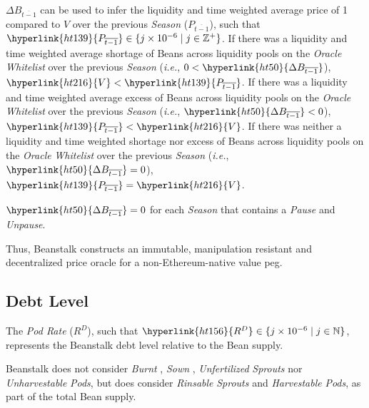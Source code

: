 \documentclass[tikz]{article}
\newcommand{\term}[1]{\textsl{#1}}
\newcommand{\Bean}{} %
\begin{document}
\hyperlink{ht50}{$\Delta B_{\overline{t-1}}$} can be used to infer the liquidity and time weighted average price of \Bean1 compared to \hyperlink{ht216}{$V$} over the previous \term{Season} (\hyperlink{ht139}{$P_{\overline{t-1}}$}), such that $\hyperlink{ht139}{P_{\overline{t-1}}} \in \{j \times 10^{-6} \mid j \in \mathbb{Z}^{+} \}$. If there was a liquidity and time weighted average shortage of Beans across liquidity pools on the \term{Oracle} \term{Whitelist} over the previous \term{Season} (\term{i.e.}, $0 < \hyperlink{ht50}{\Delta B_{\overline{t-1}}}$), $\hyperlink{ht216}{V} < \hyperlink{ht139}{P_{\overline{t-1}}}$. If there was a liquidity and time weighted average excess of Beans across liquidity pools on the \term{Oracle} \term{Whitelist} over the previous \term{Season} (\term{i.e.}, $\hyperlink{ht50}{\Delta B_{\overline{t-1}}} < 0$), $\hyperlink{ht139}{P_{\overline{t-1}}} < \hyperlink{ht216}{V}$. If there was neither a liquidity and time weighted shortage nor excess of Beans across liquidity pools on the \term{Oracle} \term{Whitelist} over the previous \term{Season} (\term{i.e.}, $\hyperlink{ht50}{\Delta B_{\overline{t-1}}} = 0$), $\hyperlink{ht139}{P_{\overline{t-1}}} = \hyperlink{ht216}{V}$. 

$\hyperlink{ht50}{\Delta B_{\overline{t-1}}} = 0$ for each \term{Season} that contains a \term{Pause} and \term{Unpause}.

Thus, Beanstalk constructs an immutable, manipulation resistant and decentralized price oracle for a non-Ethereum-native value peg.

\subsection{Debt Level}
The \term{Pod Rate} (\hyperlink{ht156}{$R^D$}), such that $\hyperlink{ht156}{R^D} \in \{j \times 10^{-6} \mid j \in \mathbb{N} \}$, represents the Beanstalk debt level relative to the Bean supply.

Beanstalk does not consider \term{Burnt} \Bean, \term{Sown} \Bean, \term{Unfertilized} \term{Sprouts} nor \term{Unharvestable} \term{Pods}, but does consider \term{Rinsable} \term{Sprouts} and \term{Harvestable} \term{Pods}, as part of the total Bean supply.
\end{document}

